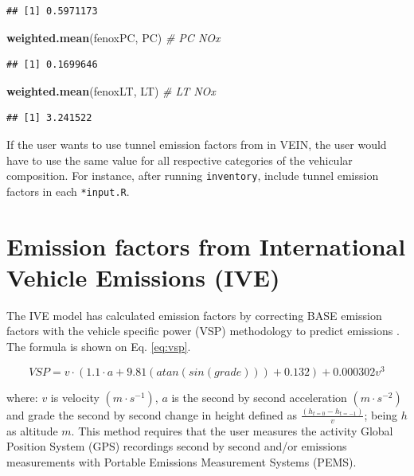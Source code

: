 \documentclass[12pt,graybox,envcountchap,sectrefs]{krantz}
\makeatletter
\newenvironment{Shaded}{\begin{snugshade}}{\end{snugshade}}
\newcommand{\KeywordTok}[1]{\textcolor[rgb]{0.13,0.29,0.53}{\textbf{#1}}}
\newcommand{\CommentTok}[1]{\textcolor[rgb]{0.56,0.35,0.01}{\textit{#1}}}
\newcommand{\NormalTok}[1]{#1}
\newenvironment{kframe}{%
\medskip{}
\setlength{\fboxsep}{.8em}
 \def\at@end@of@kframe{}%
 \ifinner\ifhmode%
  \def\at@end@of@kframe{\end{minipage}}%
  \begin{minipage}{\columnwidth}%
 \fi\fi%
 \def\FrameCommand##1{\hskip\@totalleftmargin \hskip-\fboxsep
 \colorbox{shadecolor}{##1}\hskip-\fboxsep
     \hskip-\linewidth \hskip-\@totalleftmargin \hskip\columnwidth}%
 \MakeFramed {\advance\hsize-\width
   \@totalleftmargin\z@ \linewidth\hsize
   \@setminipage}}%
 {\par\unskip\endMakeFramed%
 \at@end@of@kframe}
\renewenvironment{Shaded}{\begin{kframe}}{\end{kframe}}
\theoremstyle{definition}
\theoremstyle{definition}
\theoremstyle{definition}
\theoremstyle{remark}
\makeatother
\begin{document}
\begin{verbatim}
## [1] 0.5971173
\end{verbatim}

\begin{Shaded}
\begin{Highlighting}[]
\KeywordTok{weighted.mean}\NormalTok{(fenoxPC, PC) }\CommentTok{# PC NOx }
\end{Highlighting}
\end{Shaded}

\begin{verbatim}
## [1] 0.1699646
\end{verbatim}

\begin{Shaded}
\begin{Highlighting}[]
\KeywordTok{weighted.mean}\NormalTok{(fenoxLT, LT) }\CommentTok{# LT NOx}
\end{Highlighting}
\end{Shaded}

\begin{verbatim}
## [1] 3.241522
\end{verbatim}

If the user wants to use tunnel emission factors from
\citet{perez2014emission} in VEIN, the user would have to use the same
value for all respective categories of the vehicular composition. For
instance, after running \texttt{inventory}, include tunnel emission
factors in each \texttt{*input.R}.

\section{Emission factors from International Vehicle Emissions
(IVE)}\label{emission-factors-from-international-vehicle-emissions-ive}

The IVE model has calculated emission factors by correcting BASE
emission factors with the vehicle specific power (VSP) methodology to
predict emissions \citep{jimenez1999vehicle}. The formula is shown on
Eq. \eqref{eq:vsp}.

\begin{equation}
VSP = v \cdot (1.1 \cdot a + 9.81(atan(sin(grade))) + 0.132) + 0.000302v^3
\label{eq:vsp}
\end{equation}

where: \(v\) is velocity \((m \cdot s^{-1})\), \(a\) is the second by
second acceleration \((m \cdot s^{-2})\) and grade the second by second
change in height defined as \(\frac{(h_{t=0} - h_{t=-1})}{v}\); being
\(h\) as altitude \(m\). This method requires that the user measures the
activity Global Position System (GPS) recordings second by second and/or
emissions measurements with Portable Emissions Measurement Systems
(PEMS).
\end{document}
